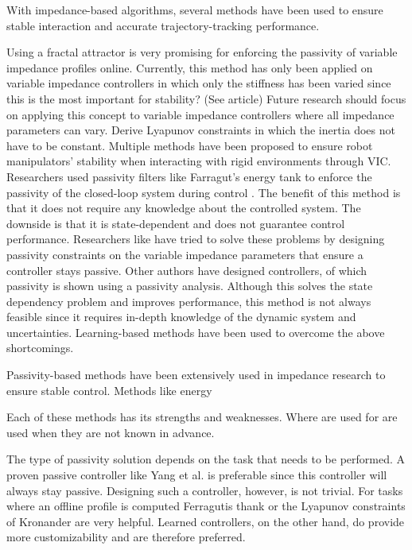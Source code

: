 With impedance-based algorithms, several methods have been used to ensure stable interaction and accurate trajectory-tracking performance. 

Using a fractal attractor is very promising for enforcing the passivity of variable impedance profiles online. Currently, this method has only been applied on variable impedance controllers in which only the stiffness has been varied since this is the most important for stability? (See article) Future research should focus on applying this concept to variable impedance controllers where all impedance parameters can vary.
Derive Lyapunov constraints in which the inertia does not have to be constant.
Multiple methods have been proposed to ensure robot manipulators' stability when interacting with rigid environments through VIC. Researchers used passivity filters like Farragut's energy tank to enforce the passivity of the closed-loop system during control \cite{ferragutiTankbasedApproachImpedance2013}. The benefit of this method is that it does not require any knowledge about the controlled system. The downside is that it is state-dependent and does not guarantee control performance. Researchers like \cite{kronanderStabilityConsiderationsVariable2016}have tried to solve these problems by designing passivity constraints on the variable impedance parameters that ensure a controller stays passive. Other authors have designed controllers, of which passivity is shown using a passivity analysis. Although this solves the state dependency problem and improves performance, this method is not always feasible since it requires in-depth knowledge of the dynamic system and uncertainties. Learning-based methods have been used to overcome the above shortcomings.

Passivity-based methods have been extensively used in impedance research to ensure stable control. Methods like energy

Each of these methods has its strengths and weaknesses. Where are used for are used when they are not known in advance.

The type of passivity solution depends on the task that needs to be performed. A proven passive controller like \cite{yangHumanlikeAdaptationForce2011} Yang et al. is preferable since this controller will always stay passive. Designing such a controller, however, is not trivial. For tasks where an offline profile is computed \cite{ferragutiTankbasedApproachImpedance2013} Ferragutis thank or the Lyapunov constraints of \cite{kronanderStabilityConsiderationsVariable2016} Kronander are very helpful. Learned controllers, on the other hand, do provide more customizability and are therefore preferred.

